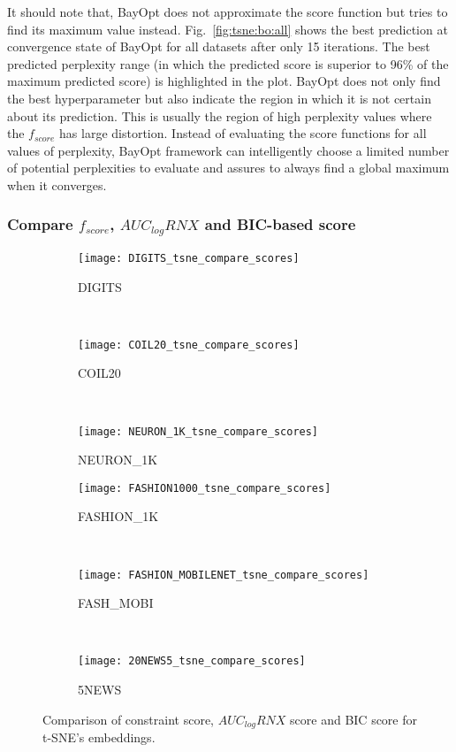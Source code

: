 It should note that, BayOpt does not approximate the score function but tries to find its maximum value instead.
Fig.~\ref{fig:tsne:bo:all} shows the best prediction at convergence state of BayOpt for all datasets after only 15 iterations.
The best predicted perplexity range (in which the predicted score is superior to 96\% of the maximum predicted score) is highlighted in the plot.
BayOpt does not only find the best hyperparameter but also indicate the region in which it is not certain about its prediction.
This is usually the region of high perplexity values where the $f_{score}$ has large distortion.
Instead of evaluating the score functions for all values of perplexity, BayOpt framework can intelligently choose a limited number of potential perplexities to evaluate and assures to always find a global maximum when it converges.

\subsubsection*{Compare $f_{score}$, $AUC_{log}RNX$ and BIC-based score}
\begin{figure}%
    \centering
    \begin{subfigure}[b]{0.3\linewidth}
        \centering
        \texttt{[image: DIGITS\_tsne\_compare\_scores]}
        \caption{DIGITS}
    \end{subfigure}
    ~
    \begin{subfigure}[b]{0.3\linewidth}
        \texttt{[image: COIL20\_tsne\_compare\_scores]}
        \caption{COIL20}
    \end{subfigure}
    ~
    \begin{subfigure}[b]{0.3\linewidth}
        \texttt{[image: NEURON\_1K\_tsne\_compare\_scores]}
        \caption{NEURON\_1K}
    \end{subfigure}
    \vfill
    \begin{subfigure}[b]{0.3\linewidth}
        \centering
        \texttt{[image: FASHION1000\_tsne\_compare\_scores]}
        \caption{FASHION\_1K}
    \end{subfigure}
    ~
    \begin{subfigure}[b]{0.3\linewidth}
        \texttt{[image: FASHION\_MOBILENET\_tsne\_compare\_scores]}
        \caption{FASH\_MOBI}
    \end{subfigure}
    ~
    \begin{subfigure}[b]{0.3\linewidth}
        \texttt{[image: 20NEWS5\_tsne\_compare\_scores]}
        \caption{5NEWS}
    \end{subfigure}
    \caption{Comparison of constraint score, $AUC_{log}RNX$ score and BIC score for t-SNE's embeddings.}
    \label{fig:tsne:compare}
\end{figure}

